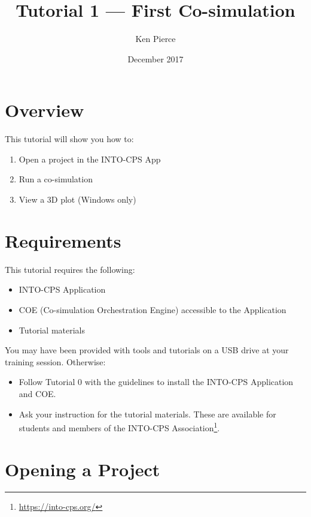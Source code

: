 \documentclass[11pt,a4paper]{../tutorial}
\title{Tutorial 1 --- First Co-simulation}
\date{December 2017}
\author{Ken Pierce}
\begin{document}
\section*{Overview}

This tutorial will show you how to:

\begin{enumerate}[noitemsep]
\item Open a project in the INTO-CPS App
\item Run a co-simulation
\item View a 3D plot (Windows only)
\end{enumerate}

\section*{Requirements}

This tutorial requires the following:
\begin{itemize}[noitemsep]
\item INTO-CPS Application
\item COE (Co-simulation Orchestration Engine) accessible to the Application
\item Tutorial materials
\end{itemize}

You may have been provided with tools and tutorials on a USB drive at your training session. Otherwise: 
\begin{itemize}[noitemsep]
\item Follow Tutorial 0 with the guidelines to install the INTO-CPS Application and COE.
\item Ask your instruction for the tutorial materials. These are available for students and members of the INTO-CPS Association\footnote{\url{https://into-cps.org/}}.
\end{itemize}




\section{Opening a Project}
\end{document}
